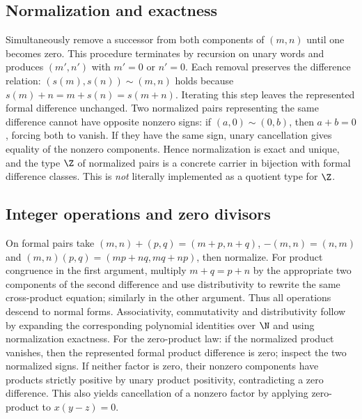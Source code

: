 \subsection{Normalization and exactness}\label{supp:5-2}
\par{}\par\smallskip

Simultaneously remove a successor from both components of $(m,n)$ until one becomes zero. This procedure terminates by recursion on unary words and produces $(m',n')$ with $m'=0$ or $n'=0$. Each removal preserves the difference relation: $(s(m),s(n))\sim(m,n)$ holds because $s(m)+n=m+s(n)=s(m+n)$. Iterating this step leaves the represented formal difference unchanged. Two normalized pairs representing the same difference cannot have opposite nonzero signs: if $(a,0)\sim(0,b)$, then $a+b=0$, forcing both to vanish. If they have the same sign, unary cancellation gives equality of the nonzero components. Hence normalization is exact and unique, and the type $\Z$ of normalized pairs is a concrete carrier in bijection with formal difference classes. This is \emph{not} literally implemented as a quotient type for $\Z$.

\subsection{Integer operations and zero divisors}\label{supp:5-3}
\par{}\par\smallskip

On formal pairs take $(m,n)+(p,q)=(m+p,n+q)$, $-(m,n)=(n,m)$ and $(m,n)(p,q)=(mp+nq,mq+np)$, then normalize. For product congruence in the first argument, multiply $m+q=p+n$ by the appropriate two components of the second difference and use distributivity to rewrite the same cross-product equation; similarly in the other argument. Thus all operations descend to normal forms. Associativity, commutativity and distributivity follow by expanding the corresponding polynomial identities over $\N$ and using normalization exactness. For the zero-product law: if the normalized product vanishes, then the represented formal product difference is zero; inspect the two normalized signs. If neither factor is zero, their nonzero components have products strictly positive by unary product positivity, contradicting a zero difference. This also yields cancellation of a nonzero factor by applying zero-product to $x(y-z)=0$.

